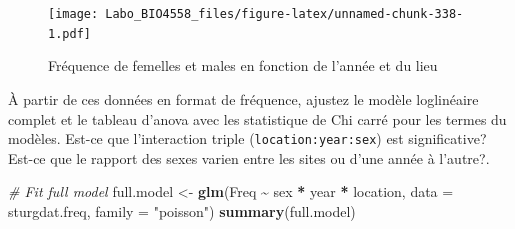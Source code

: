 \documentclass[
  12pt,
]{book}
\makeatletter
\newenvironment{Shaded}{\begin{snugshade}}{\end{snugshade}}
\newcommand{\CommentTok}[1]{\textcolor[rgb]{0.56,0.35,0.01}{\textit{#1}}}
\newcommand{\DataTypeTok}[1]{\textcolor[rgb]{0.13,0.29,0.53}{#1}}
\newcommand{\KeywordTok}[1]{\textcolor[rgb]{0.13,0.29,0.53}{\textbf{#1}}}
\newcommand{\NormalTok}[1]{#1}
\newcommand{\OperatorTok}[1]{\textcolor[rgb]{0.81,0.36,0.00}{\textbf{#1}}}
\newcommand{\StringTok}[1]{\textcolor[rgb]{0.31,0.60,0.02}{#1}}
\newenvironment{kframe}{%
\medskip{}
\setlength{\fboxsep}{.8em}
\def\at@end@of@kframe{}%
\ifinner\ifhmode%
 \def\at@end@of@kframe{\end{minipage}}%
 \begin{minipage}{\columnwidth}%
\fi\fi%
\def\FrameCommand##1{\hskip\@totalleftmargin \hskip-\fboxsep
\colorbox{incolor}{##1}\hskip-\fboxsep
    \hskip-\linewidth \hskip-\@totalleftmargin \hskip\columnwidth}%
\MakeFramed {\advance\hsize-\width
  \@totalleftmargin\z@ \linewidth\hsize
  \@setminipage}}%
{\par\unskip\endMakeFramed%
\at@end@of@kframe}
\newenvironment{rmdblock}[1]
 {
 \begin{itemize}
 \renewcommand{\labelitemi}{
   \raisebox{-.7\height}[0pt][0pt]{
     {\setkeys{Gin}{width=3em,keepaspectratio}\texttt{[image: images/\#1]}}
   }
 }
 \begin{kframe}
 \setlength{\fboxsep}{1em}
 \item
 }
 {
 \end{kframe}
 \end{itemize}
 }
\newenvironment{rmdcode}
  {\begin{rmdblock}{screen}}
  {\end{rmdblock}}
\makeatother
\begin{document}
\begin{figure}
\centering
\texttt{[image: Labo\_BIO4558\_files/figure-latex/unnamed-chunk-338-1.pdf]}
\caption{\label{fig:unnamed-chunk-338}Fréquence de femelles et males en fonction de l'année et du lieu}
\end{figure}

\begin{rmdcode}
À partir de ces données en format de fréquence, ajustez le modèle loglinéaire complet et le tableau d'anova avec les statistique de Chi carré pour les termes du modèles. Est-ce que l'interaction triple (\texttt{location:year:sex}) est significative? Est-ce que le rapport des sexes varien entre les sites ou d'une année à l'autre?.
\end{rmdcode}

\begin{Shaded}
\begin{Highlighting}[]
\CommentTok{\# Fit full model}
\NormalTok{full.model \textless{}{-}}\StringTok{ }\KeywordTok{glm}\NormalTok{(Freq }\OperatorTok{\textasciitilde{}}\StringTok{ }\NormalTok{sex }\OperatorTok{*}\StringTok{ }\NormalTok{year }\OperatorTok{*}\StringTok{ }\NormalTok{location, }\DataTypeTok{data =}\NormalTok{ sturgdat.freq, }\DataTypeTok{family =} \StringTok{"poisson"}\NormalTok{)}
\KeywordTok{summary}\NormalTok{(full.model)}
\end{Highlighting}
\end{Shaded}
\end{document}
